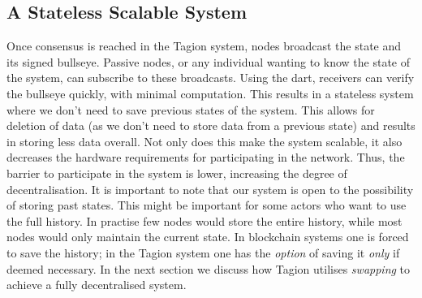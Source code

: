 \subsection{A Stateless Scalable System}
    Once consensus is reached in the Tagion system, nodes broadcast the state and its signed \gls{bullseye}. Passive nodes, or any individual wanting to know the state of the system, can subscribe to these broadcasts. Using the \gls{dart}, receivers can verify the \gls{bullseye} quickly, with minimal computation. This results in a stateless system where we don't need to save previous states of the system. This allows for deletion of data (as we don't need to store data from a previous state) and results in storing less data overall. Not only does this make the system scalable, it also decreases the hardware requirements for participating in the network. Thus, the barrier to participate in the system is lower, increasing the degree of decentralisation. It is important to note that our system is open to the possibility of storing past states. This might be important for some actors who want to use the full history. In practise few nodes would store the entire history, while most nodes would only maintain the current state. In blockchain systems one is forced to save the history; in the Tagion system one has the \textit{option} of saving it \textit{only} if deemed necessary. In the next section we discuss how Tagion utilises \textit{swapping} to achieve a fully decentralised system.
\pagebreak